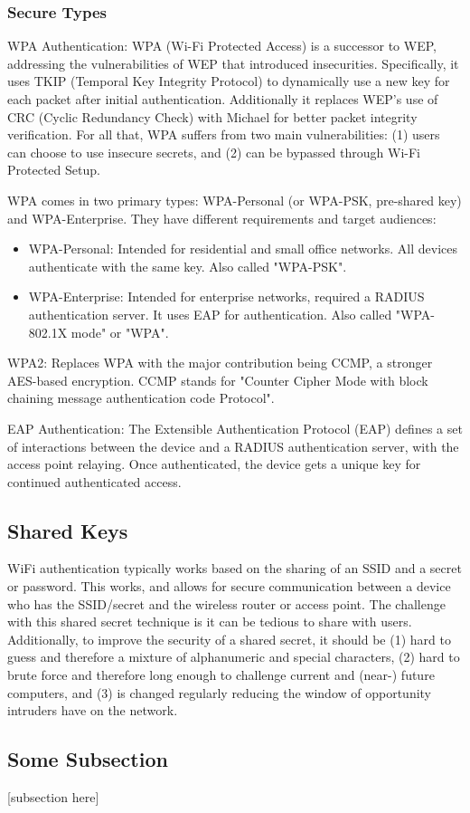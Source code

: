 \subsubsection{Secure Types}
\begin{description}
  \item{WPA Authentication:} WPA (Wi-Fi Protected Access) is a successor to WEP, addressing the
  vulnerabilities of WEP that introduced insecurities. Specifically, it uses TKIP (Temporal Key
  Integrity Protocol) to dynamically use a new key for each packet after initial authentication.
  Additionally it replaces WEP's use of CRC (Cyclic Redundancy Check) with Michael for better packet
  integrity verification. For all that, WPA suffers from two main vulnerabilities: (1) users can
  choose to use insecure secrets, and (2) can be bypassed through Wi-Fi Protected Setup.

  WPA comes in two primary types: WPA-Personal (or WPA-PSK, pre-shared key) and WPA-Enterprise. They
  have different requirements and target audiences: \cite{wiki:WPA}
  \begin{itemize}
  \item{WPA-Personal:} Intended for residential and small office networks. All devices authenticate
  with the same key. Also called "WPA-PSK".
  \item{WPA-Enterprise:} Intended for enterprise networks, required a RADIUS authentication server.
  It uses EAP for authentication. Also called "WPA-802.1X mode" or "WPA".
  \end{itemize}

  \item{WPA2:} Replaces WPA with the major contribution being CCMP, a stronger AES-based encryption.
  CCMP stands for "Counter Cipher Mode with block chaining message authentication code Protocol".

  \item{EAP Authentication:} The Extensible Authentication Protocol (EAP) defines a set of
  interactions between the device and a RADIUS authentication server, with the access point
  relaying. Once authenticated, the device gets a unique key for continued authenticated access.
\end{description}

\subsection{Shared Keys}
WiFi authentication typically works based on the sharing of an SSID and a secret or password.
This works, and allows for secure communication between a device who has the SSID/secret and
the wireless router or access point. The challenge with this shared secret technique is it
can be tedious to share with users. Additionally, to improve the security of a shared secret,
it should be (1) hard to guess and therefore a mixture of alphanumeric and special characters,
(2) hard to brute force and therefore long enough to challenge current and (near-) future computers,
and (3) is changed regularly reducing the window of opportunity intruders have on the network.



\subsection{Some Subsection}
[subsection here]
